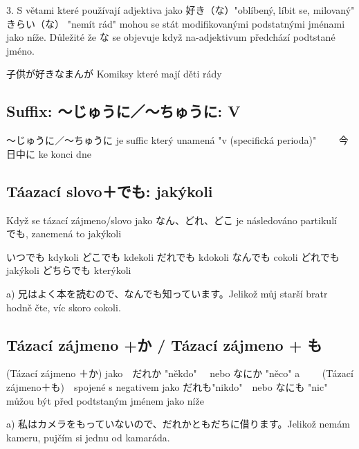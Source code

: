 3. S větami které používají adjektiva jako 好き（な）"oblíbený, líbit se, milovaný"　きらい（な） "nemít rád"  mohou se stát modifikovanými podstatnými jménami jako níže. Důležité že な se objevuje když na-adjektivum předchází podtstané jméno.

子供が好きなまんが Komiksy které mají děti rády



\subsection{Suffix: 〜じゅうに／〜ちゅうに: V}
〜じゅうに／〜ちゅうに je suffic který unamená "v (specifická perioda)"　　
今日中に ke konci dne

\subsection{Táazací slovo＋でも: jakýkoli}

Když se tázací zájmeno/slovo jako なん、どれ、どこ je následováno partikulí　でも, zanemená to jakýkoli

いつでも kdykoli
どこでも kdekoli
だれでも kdokoli
なんでも cokoli
どれでも jakýkoli
どちらでも kterýkoli


a) 兄はよく本を読むので、なんでも知っています。Jelikož můj starší bratr hodně čte, víc skoro cokoli.

\subsection{Tázací zájmeno +か / Tázací zájmeno + も}
(Tázací zájmeno ＋か) jako　だれか "někdo"　 nebo なにか "něco" a 　　(Tázací zájmeno＋も)　spojené s negativem jako だれも"nikdo"　nebo なにも "nic" můžou být před podtstaným jménem jako níže

a) 私はカメラをもっていないので、だれかともだちに借ります。Jelikož nemám kameru, pujčím si jednu od kamaráda.































